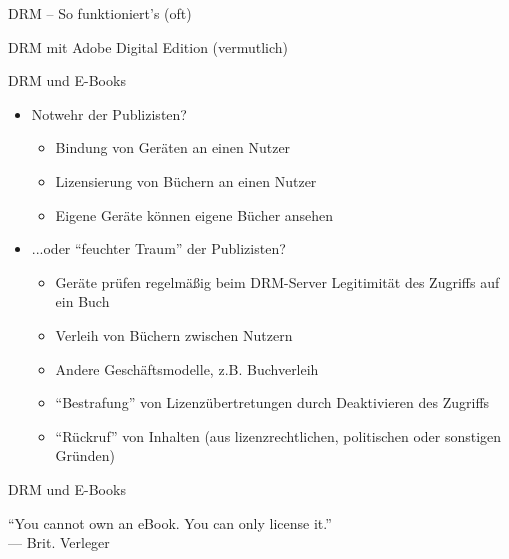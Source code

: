 \begin{frame}{DRM -- So funktioniert's (oft)}
	\begin{center}
		\def\svgwidth{10cm}
		
	\end{center}
\end{frame}

\begin{frame}{DRM mit Adobe Digital Edition (vermutlich)}
	\begin{center}
		\def\svgwidth{10cm}
		
	\end{center}
\end{frame}

\begin{frame}{DRM und E-Books}
	\begin{itemize}
		\item Notwehr der Publizisten?
		\begin{itemize}
			\item Bindung von Geräten an einen Nutzer
			\item Lizensierung von Büchern an einen Nutzer
			\item Eigene Geräte können eigene Bücher ansehen
		\end{itemize}
		\item<2-> ...oder "`feuchter Traum"' der Publizisten?
		\begin{itemize}
			\item<2-> Geräte prüfen regelmäßig beim DRM-Server Legitimität des Zugriffs auf ein Buch
			\item<2-> Verleih von Büchern zwischen Nutzern
			\item<2-> Andere Geschäftsmodelle, z.B. Buchverleih
			\item<2-> "`Bestrafung"' von Lizenzübertretungen durch Deaktivieren des Zugriffs
			\item<2-> "`Rückruf"' von Inhalten (aus lizenzrechtlichen, politischen oder sonstigen Gründen)
		\end{itemize}
	\end{itemize}
\end{frame}

\begin{frame}{DRM und E-Books}
	\begin{block}{ }
		"`You cannot own an eBook. You can only license it."' \\
		--- Brit. Verleger
	\end{block}
\end{frame}


